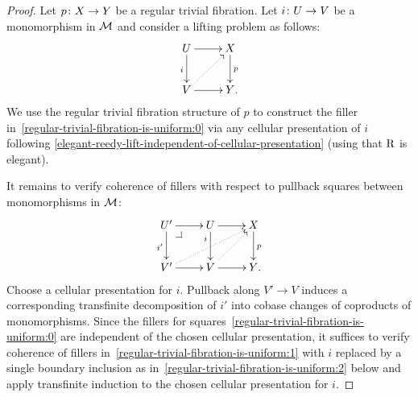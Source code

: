 \documentclass[reqno,10pt,a4paper,oneside,draft]{amsart}
\begin{document}
\begin{proof}
Let $p \co X \to Y$ be a regular trivial fibration.
Let $i \co U \to V$ be a monomorphism in $\cal{M}$ and consider a lifting problem as follows:
\begin{equation} \label{regular-trivial-fibration-is-uniform:0}
\begin{gathered}
\xymatrix{
  U
  \ar[d]_{i}
  \ar[r]
&
  X
  \ar[d]^{p}
\\
  V
  \ar[r]
  \ar@{.>}[ur]
&
  Y
\rlap{.}}
\end{gathered}
\end{equation}
We use the regular trivial fibration structure of $p$ to construct the filler in~\eqref{regular-trivial-fibration-is-uniform:0} via any cellular presentation of $i$ following \cref{elegant-reedy-lift-independent-of-cellular-presentation} (using that $\R$ is elegant).

It remains to verify coherence of fillers with respect to pullback squares between monomorphisms in $\cal{M}$:
\begin{equation} \label{regular-trivial-fibration-is-uniform:1}
\begin{gathered}
\xymatrix{
  U'
  \ar[d]_{i'}
  \ar[r]
  \pullback{dr}
&
  U
  \ar[d]_(0.3){i}
  \ar[r]
&
  X
  \ar[d]^{p}
\\
  V'
  \ar[r]
  \ar@{.>}[urr]
&
  V
  \ar[r]
  \ar@{.>}[ur]
&
  Y
\rlap{.}}
\end{gathered}
\end{equation}
Choose a cellular presentation for $i$.
Pullback along $V' \to V$ induces a corresponding transfinite decomposition of $i'$ into cobase changes of coproducts of monomorphisms.
Since the fillers for squares~\eqref{regular-trivial-fibration-is-uniform:0} are independent of the chosen cellular presentation, it suffices to verify coherence of fillers in~\eqref{regular-trivial-fibration-is-uniform:1} with $i$ replaced by a single boundary inclusion as in~\eqref{regular-trivial-fibration-is-uniform:2} below and apply transfinite induction to the chosen cellular presentation for $i$.


\end{proof}
\end{document}
